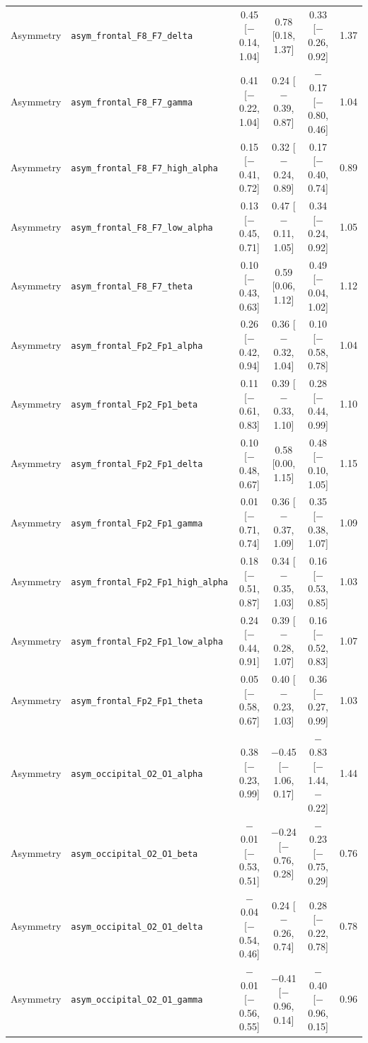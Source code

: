 {\begin{longtable}{llcccc}
Asymmetry & \texttt{asym\_frontal\_F8\_F7\_delta} & 0.45 [$-$0.14, 1.04] & 0.78 [0.18, 1.37] & 0.33 [$-$0.26, 0.92] & 1.37 \\
Asymmetry & \texttt{asym\_frontal\_F8\_F7\_gamma} & 0.41 [$-$0.22, 1.04] & 0.24 [$-$0.39, 0.87] & $-$0.17 [$-$0.80, 0.46] & 1.04 \\
Asymmetry & \texttt{asym\_frontal\_F8\_F7\_high\_alpha} & 0.15 [$-$0.41, 0.72] & 0.32 [$-$0.24, 0.89] & 0.17 [$-$0.40, 0.74] & 0.89 \\
Asymmetry & \texttt{asym\_frontal\_F8\_F7\_low\_alpha} & 0.13 [$-$0.45, 0.71] & 0.47 [$-$0.11, 1.05] & 0.34 [$-$0.24, 0.92] & 1.05 \\
Asymmetry & \texttt{asym\_frontal\_F8\_F7\_theta} & 0.10 [$-$0.43, 0.63] & 0.59 [0.06, 1.12] & 0.49 [$-$0.04, 1.02] & 1.12 \\
Asymmetry & \texttt{asym\_frontal\_Fp2\_Fp1\_alpha} & 0.26 [$-$0.42, 0.94] & 0.36 [$-$0.32, 1.04] & 0.10 [$-$0.58, 0.78] & 1.04 \\
Asymmetry & \texttt{asym\_frontal\_Fp2\_Fp1\_beta} & 0.11 [$-$0.61, 0.83] & 0.39 [$-$0.33, 1.10] & 0.28 [$-$0.44, 0.99] & 1.10 \\
Asymmetry & \texttt{asym\_frontal\_Fp2\_Fp1\_delta} & 0.10 [$-$0.48, 0.67] & 0.58 [0.00, 1.15] & 0.48 [$-$0.10, 1.05] & 1.15 \\
Asymmetry & \texttt{asym\_frontal\_Fp2\_Fp1\_gamma} & 0.01 [$-$0.71, 0.74] & 0.36 [$-$0.37, 1.09] & 0.35 [$-$0.38, 1.07] & 1.09 \\
Asymmetry & \texttt{asym\_frontal\_Fp2\_Fp1\_high\_alpha} & 0.18 [$-$0.51, 0.87] & 0.34 [$-$0.35, 1.03] & 0.16 [$-$0.53, 0.85] & 1.03 \\
Asymmetry & \texttt{asym\_frontal\_Fp2\_Fp1\_low\_alpha} & 0.24 [$-$0.44, 0.91] & 0.39 [$-$0.28, 1.07] & 0.16 [$-$0.52, 0.83] & 1.07 \\
Asymmetry & \texttt{asym\_frontal\_Fp2\_Fp1\_theta} & 0.05 [$-$0.58, 0.67] & 0.40 [$-$0.23, 1.03] & 0.36 [$-$0.27, 0.99] & 1.03 \\
Asymmetry & \texttt{asym\_occipital\_O2\_O1\_alpha} & 0.38 [$-$0.23, 0.99] & $-$0.45 [$-$1.06, 0.17] & $-$0.83 [$-$1.44, $-$0.22] & 1.44 \\
Asymmetry & \texttt{asym\_occipital\_O2\_O1\_beta} & $-$0.01 [$-$0.53, 0.51] & $-$0.24 [$-$0.76, 0.28] & $-$0.23 [$-$0.75, 0.29] & 0.76 \\
Asymmetry & \texttt{asym\_occipital\_O2\_O1\_delta} & $-$0.04 [$-$0.54, 0.46] & 0.24 [$-$0.26, 0.74] & 0.28 [$-$0.22, 0.78] & 0.78 \\
Asymmetry & \texttt{asym\_occipital\_O2\_O1\_gamma} & $-$0.01 [$-$0.56, 0.55] & $-$0.41 [$-$0.96, 0.14] & $-$0.40 [$-$0.96, 0.15] & 0.96 \\

\end{longtable}}
